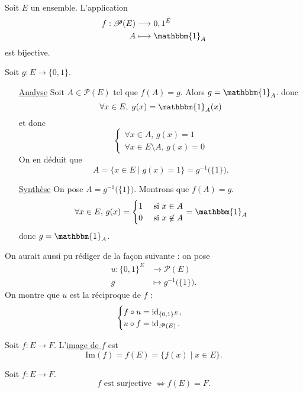\begin{exo}
	Soit $E$ un ensemble. L'application \begin{align*}
		f: \mathcal{P}(E) &\longrightarrow {0,1}^E \\
		A &\longmapsto \mathbbm{1}_A
	\end{align*} est bijective.

	Soit $g : E \to \{0,1\}$.
	\begin{itemize}
		\item[\underline{\sc Analyse}] Soit $A \in \mathcal{P}(E)$ tel que $f(A) = g$. Alors $g = \mathbbm{1}_A$.
			donc  \[
				\forall x \in E,\; g(x) = \mathbbm{1}_A(x)
			\] et donc \[
				\begin{cases}
					\forall x \in A,\, g(x) = 1\\
					\forall x \in E \setminus A,\,g(x) = 0
				\end{cases}
			\] On en déduit que \[
				A = \{ x \in E  \mid  g(x) = 1\}  = g^{-1}\big(\{1\}\big).
			\]
		\item[\underline{\sc Synthèse}] On pose $A = g^{-1}\big(\{1\}\big)$. Montrons que $f(A) = g$.
			\[
				\forall x \in E,\,g(x) = \begin{cases}
					1 &\text{ si } x \in A\\
					0 &\text{ si } x \not\in A
				\end{cases} = \mathbbm{1}_A
			\] donc $g = \mathbbm{1}_A$.
	\end{itemize}

	On aurait aussi pu rédiger de la façon suivante : on pose \begin{align*}
		u: \{0,1\}^E &\longrightarrow \mathcal{P}(E) \\
		g &\longmapsto g^{-1}\big(\{1\}\big).
	\end{align*} On montre que $u$ est la réciproque de $f$ : \[
		\begin{cases}
			f \circ u = \operatorname{id}_{\{0,1\}^E},\\
			u \circ f = \operatorname{id}_{\mathcal{P}(E)}.
		\end{cases}
	\]
\end{exo}

\begin{defn}
	Soit $f : E \to F$. L'\underline{image de $f$} est \[
		\mathrm{Im}(f) = f(E) = \big\{f(x) \mid x \in E\big\}.
	\]
\end{defn}

\begin{prop}
	Soit $f: E \to F$. \[
		f \text{ est surjective } \iff f(E) = F.
	\]
\end{prop}

